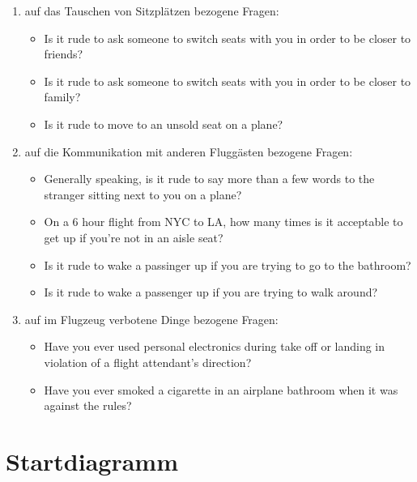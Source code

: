 \documentclass{scrartcl}
\begin{document}
\begin{enumerate}
\item auf das Tauschen von Sitzplätzen bezogene Fragen: 
\begin{itemize}
\item Is it rude to ask someone to switch seats with you in order to be closer to friends?
\item Is it rude to ask someone to switch seats with you in order to be closer to family?
\item Is it rude to move to an unsold seat on a plane? 
\newline \newline
\end{itemize}


\item auf die Kommunikation mit anderen Fluggästen bezogene Fragen:
\begin{itemize}
\item Generally speaking, is it rude to say more than a few words to the stranger sitting next to you on a plane?
\item On a 6 hour flight from NYC to LA, how many times is it acceptable to get up if you're not in an aisle seat?
\item Is it rude to wake a passinger up if you are trying to go to the bathroom?
\item Is it rude to wake a passenger up if you are trying to walk around?
\newline \newline
\end{itemize}


\item auf im Flugzeug verbotene Dinge bezogene Fragen:
\begin{itemize}
\item Have you ever used personal electronics during take off or landing in violation of a flight attendant's direction?
\item Have you ever smoked a cigarette in an airplane bathroom when it was against the rules? 
\end{itemize}


\end{enumerate}

\section{Startdiagramm}
\end{document}
